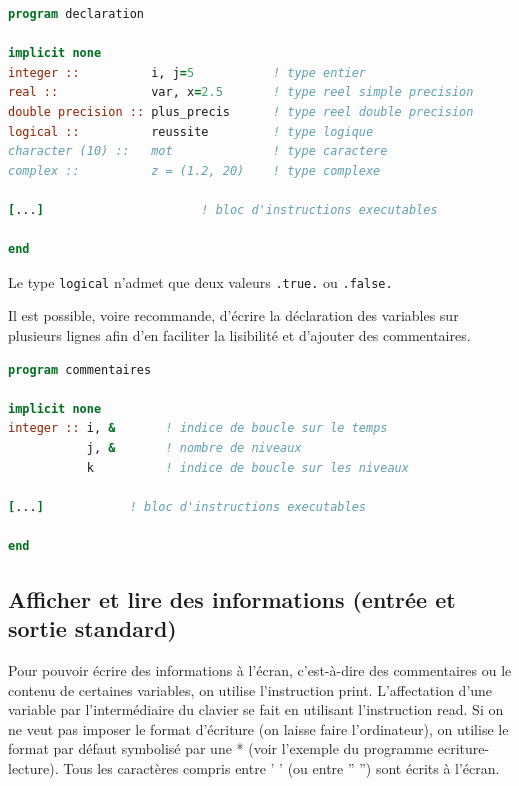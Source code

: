 \documentclass[a4paper,twoside]{article}
\begin{document}
\begin{exemple}
\begin{lstlisting}[language=Fortran]
program declaration
       
implicit none          
integer ::          i, j=5           ! type entier
real ::             var, x=2.5       ! type reel simple precision 
double precision :: plus_precis      ! type reel double precision 
logical ::          reussite         ! type logique 
character (10) ::   mot              ! type caractere
complex ::          z = (1.2, 20)    ! type complexe
   
[...]                      ! bloc d'instructions executables
      
end
\end{lstlisting}
\end{exemple}

Le type \texttt{logical} n'admet que deux valeurs \texttt{.true.} ou \texttt{.false.}

\begin{remarque}
Il est possible, voire recommande, d'écrire la déclaration des variables sur plusieurs lignes afin d'en faciliter la lisibilité et d'ajouter des commentaires.

\begin{lstlisting}[language=Fortran]
program commentaires 
 
implicit none
integer :: i, &       ! indice de boucle sur le temps
           j, &       ! nombre de niveaux  
           k          ! indice de boucle sur les niveaux 
    
[...]            ! bloc d'instructions executables
  
end
\end{lstlisting}
\end{remarque}

\subsection{Afficher et lire des informations (entrée et sortie standard)}
Pour pouvoir écrire des informations à l'écran, c'est-à-dire des commentaires ou le contenu de certaines variables, on utilise l'instruction print. L'affectation d'une variable par l'intermédiaire du clavier se fait en utilisant l'instruction read. Si on ne veut pas imposer le format d'écriture (on laisse faire l'ordinateur), on utilise le format par défaut symbolisé par une * (voir l'exemple du programme ecriture-lecture). Tous les caractères compris entre ' ' (ou entre ” ”) sont écrits à l'écran.
\end{document}
